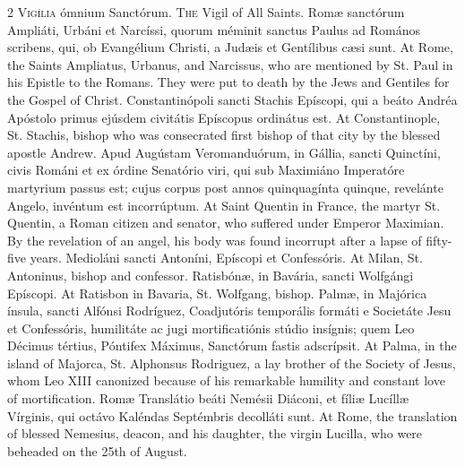 \begin{paracol}{2}
\lettrine[lines=1]{V}{igília} ómnium 
 Sanctórum.
\switchcolumn
{}
\lettrine[lines=1]{T}{he} Vigil of All Saints.
\switchcolumn*
{}
Romæ sanctórum Ampliáti, 
 Urbáni et Narcíssi, quorum méminit sanctus Paulus ad Romános scribens, qui, 
 ob Evangélium Christi, a Judæis et Gentílibus cæsi sunt.
\switchcolumn
{}
At Rome, the Saints Ampliatus, 
 Urbanus, and Narcissus, who are mentioned by St. Paul in his Epistle to the 
 Romans. They were put to death by the Jews and Gentiles for the Gospel 
 of Christ.
\switchcolumn*
{}
Constantinópoli sancti 
 Stachis Epíscopi, qui a beáto Andréa Apóstolo primus ejúsdem civitátis 
 Epíscopus ordinátus est.
\switchcolumn
{}
At Constantinople, St. Stachis, 
 bishop who was consecrated first bishop of that city by the blessed apostle 
 Andrew.
\switchcolumn*
{}
Apud Augústam 
 Veromanduórum, in Gállia, sancti Quinctíni, civis Románi et ex órdine 
 Senatório viri, qui sub Maximiáno Imperatóre martyrium passus est; cujus 
 corpus post annos quinquagínta quinque, revelánte Angelo, invéntum est 
 incorrúptum.
\switchcolumn
{}
At Saint Quentin in France, the 
 martyr St. Quentin, a Roman citizen and senator, who suffered under Emperor 
 Maximian. By the revelation of an angel, his body was found incorrupt 
 after a lapse of fifty-five years.
\switchcolumn*
{}
Medioláni sancti 
 Antoníni, Epíscopi et Confessóris.
\switchcolumn
{}
At Milan, St. Antoninus, bishop and 
 confessor.
\switchcolumn*
{}
Ratisbónæ, in Bavária, sancti Wolfgángi Epíscopi.
\switchcolumn
{}
At Ratisbon in Bavaria, St. 
 Wolfgang, bishop.
\switchcolumn*
{}
Palmæ, in Majórica ínsula, sancti Alfónsi Rodríguez, Coadjutóris temporális
formáti e Societáte Jesu et Confessóris, humilitáte ac jugi mortificatiónis
stúdio insígnis; quem Leo Décimus tértius, Póntifex Máximus, Sanctórum
fastis adscrípsit.
\switchcolumn
{}
At Palma, in the island of Majorca, 
 St. Alphonsus Rodriguez, a lay brother of the Society of Jesus, whom Leo 
 XIII canonized because of his remarkable humility and constant love of 
 mortification.
\switchcolumn*
{}
Romæ Translátio beáti 
 Nemésii Diáconi, et fíliæ Lucíllæ Vírginis, qui octávo Kaléndas Septémbris 
 decolláti sunt.
\switchcolumn
{}
At Rome, the translation of blessed 
 Nemesius, deacon, and his daughter, the virgin Lucilla, who were beheaded on 
 the 25th of August.
\switchcolumn*
{}
\end{paracol}

